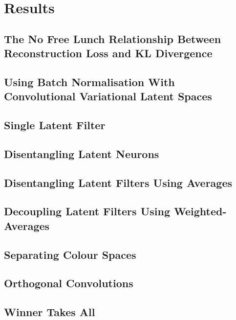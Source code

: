 \chapter{Results}

\label{ch:Results}

%
%
%
%
%
\section{The No Free Lunch Relationship Between Reconstruction Loss and KL Divergence}
\lipsum[2]


%
%
%
%
%
\section{Using Batch Normalisation With Convolutional Variational Latent Spaces}
\lipsum[2]


%
%
%
%
%
\section{Single Latent Filter}
\lipsum[2]


%
%
%
%
%
\section{Disentangling Latent Neurons}
\lipsum[2]


%
%
%
%
%
\section{Disentangling Latent Filters Using Averages}
\lipsum[2]


%
%
%
%
%
\section{Decoupling Latent Filters Using Weighted-Averages}
\lipsum[2]


%
%
%
%
%
\section{Separating Colour Spaces}
\lipsum[2]


%
%
%
%
%
\section{Orthogonal Convolutions}
\lipsum[2]


%
%
%
%
%
\section{Winner Takes All}
\lipsum[2]
